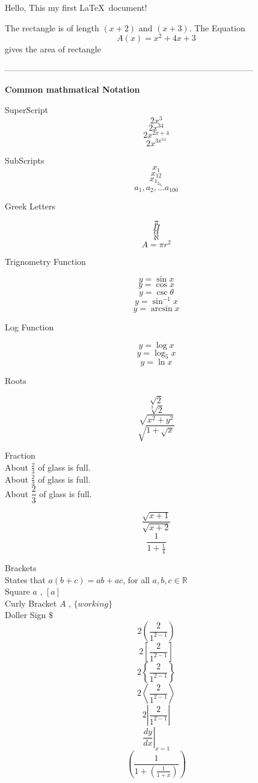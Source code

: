 \documentclass[]{article}
\begin{document}
Hello, This my first \LaTeX\ document!

The rectangle is of length $(x+2)$ and $(x+3)$.
The Equation $${A(x)=x^2+4x+3}$$ gives the area of rectangle

-----------------------------------------------------------------------------------------

\textbf{Common mathmatical Notation}

SuperScript $$2x^3$$
$$2x^{34}$$
$$2x^{2x+4}$$
$$2x^{3x^{54}}$$

SubScripts  $${x_1}$$
$${x_{12}}$$
$${x_{1_{2_{3_4}}}}$$
$${a_1}, {a_2}, \ldots {a_{100}}$$

Greek Letters   

$$\pi$$
$$\Pi$$
$$\alpha$$
$$\aleph$$
$$A= \pi r^2$$

Trignometry Function

$$y=\sin x$$
$$ y = \cos x $$
$$ y = \csc \theta $$
$$ y = \sin ^{-1} x $$
$$ y = \arcsin x $$


Log Function

$$ y = \log x $$
$$ y = \log_5 x $$
$$ y = \ln x $$

Roots

$$ \sqrt{2} $$
$$ \sqrt[3]{2} $$
$$ \sqrt{x^2 + y^2} $$
$$ \sqrt{ 1 + \sqrt{x} } $$



Fraction \\[16pt]

About $ \frac{2}{3} $ of glass is full.\\[16pt]
About $ \displaystyle \frac{2}{3} $ of glass is full.\\[16pt]
About $  \dfrac{2}{3} $ of glass is full.

$$ \frac{ \sqrt{x+1} } { \sqrt{x+2} } $$
$$ \frac{ 1 } { 1+ \frac{1}{4} } $$

Brackets \\[16pt]

States that $a(b+c)=ab+ac$, for all $ a, b, c \in \mathbb{R} $ \\[6pt]
Square $a$ , $[a]$ \\[6pt]
Curly Bracket ${A}$ , $\{working\}$ \\[6pt]
Doller Sign $\$$ \\[6pt]
$$ 2 \left ( \frac{2}{1^{2-1}} \right ) $$
$$ 2 \left [ \frac{2}{1^{2-1}} \right ] $$
$$ 2 \left \{ \frac{2}{1^{2-1}} \right \} $$
$$  2 \left \langle \frac{2}{1^{2-1}} \right \rangle  $$
$$  2 \left | \frac{2}{1^{2-1}} \right |  $$ 
$$ \left. \frac{dy}{dx} \right| _{x=1} $$
$$ \left( \frac{1}{1 + \left( \frac{1}{1+x} \right)} \right)  $$
\end{document}
